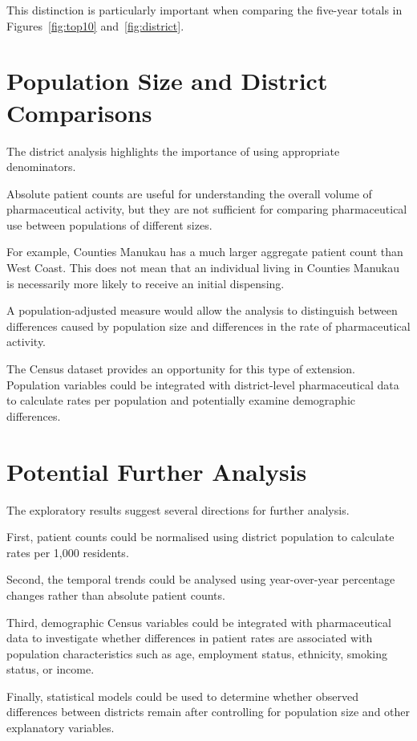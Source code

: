 \documentclass[11pt,a4paper]{report}
\begin{document}
This distinction is particularly important when comparing the five-year totals in Figures~\ref{fig:top10} and~\ref{fig:district}.


\section{Population Size and District Comparisons}

The district analysis highlights the importance of using appropriate denominators.

Absolute patient counts are useful for understanding the overall volume of pharmaceutical activity, but they are not sufficient for comparing pharmaceutical use between populations of different sizes.

For example, Counties Manukau has a much larger aggregate patient count than West Coast. This does not mean that an individual living in Counties Manukau is necessarily more likely to receive an initial dispensing.

A population-adjusted measure would allow the analysis to distinguish between differences caused by population size and differences in the rate of pharmaceutical activity.

The Census dataset provides an opportunity for this type of extension. Population variables could be integrated with district-level pharmaceutical data to calculate rates per population and potentially examine demographic differences.


\section{Potential Further Analysis}

The exploratory results suggest several directions for further analysis.

First, patient counts could be normalised using district population to calculate rates per 1,000 residents.

Second, the temporal trends could be analysed using year-over-year percentage changes rather than absolute patient counts.

Third, demographic Census variables could be integrated with pharmaceutical data to investigate whether differences in patient rates are associated with population characteristics such as age, employment status, ethnicity, smoking status, or income.

Finally, statistical models could be used to determine whether observed differences between districts remain after controlling for population size and other explanatory variables.
\end{document}
